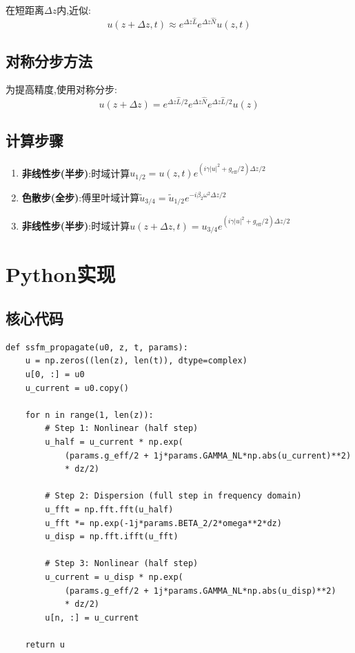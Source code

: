 \documentclass[12pt,a4paper]{article}
\theoremstyle{definition}
\begin{document}
在短距离$\Delta z$内,近似:
\begin{equation}
u(z+\Delta z,t)\approx e^{\Delta z\hat{L}}e^{\Delta z\hat{N}}u(z,t)
\end{equation}

\subsection{对称分步方法}

为提高精度,使用对称分步:
\begin{equation}
u(z+\Delta z)=e^{\Delta z\hat{L}/2}e^{\Delta z\hat{N}}e^{\Delta z\hat{L}/2}u(z)
\end{equation}

\subsection{计算步骤}

\begin{enumerate}
    \item \textbf{非线性步(半步)}:时域计算$u_{1/2}=u(z,t)e^{(i\gamma|u|^2+g_{\text{eff}}/2)\Delta z/2}$
    \item \textbf{色散步(全步)}:傅里叶域计算$\tilde{u}_{3/4}=\tilde{u}_{1/2}e^{-i\beta_2\omega^2\Delta z/2}$
    \item \textbf{非线性步(半步)}:时域计算$u(z+\Delta z,t)=u_{3/4}e^{(i\gamma|u|^2+g_{\text{eff}}/2)\Delta z/2}$
\end{enumerate}

\section{Python实现}

\subsection{核心代码}

\begin{verbatim}
def ssfm_propagate(u0, z, t, params):
    u = np.zeros((len(z), len(t)), dtype=complex)
    u[0, :] = u0
    u_current = u0.copy()
    
    for n in range(1, len(z)):
        # Step 1: Nonlinear (half step)
        u_half = u_current * np.exp(
            (params.g_eff/2 + 1j*params.GAMMA_NL*np.abs(u_current)**2) 
            * dz/2)
        
        # Step 2: Dispersion (full step in frequency domain)
        u_fft = np.fft.fft(u_half)
        u_fft *= np.exp(-1j*params.BETA_2/2*omega**2*dz)
        u_disp = np.fft.ifft(u_fft)
        
        # Step 3: Nonlinear (half step)
        u_current = u_disp * np.exp(
            (params.g_eff/2 + 1j*params.GAMMA_NL*np.abs(u_disp)**2) 
            * dz/2)
        u[n, :] = u_current
    
    return u
\end{verbatim}
\end{document}
